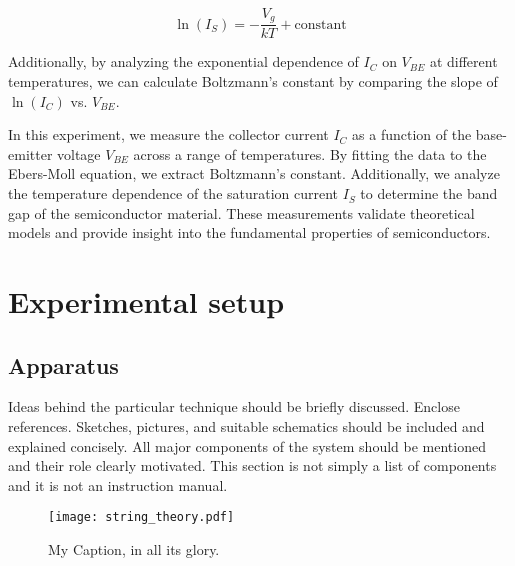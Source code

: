 \documentclass[12pt,letterpaper,onecolumn]{article}
\begin{document}
\[
\ln(I_S) = -\frac{V_g}{kT} + \text{constant}
\]

Additionally, by analyzing the exponential dependence of \( I_C \) on \( V_{BE} \) at different temperatures, we can calculate Boltzmann’s constant by comparing the slope of \( \ln(I_C) \) vs. \( V_{BE} \).

In this experiment, we measure the collector current \( I_C \) as a function of the base-emitter voltage \( V_{BE} \) across a range of temperatures. By fitting the data to the Ebers-Moll equation, we extract Boltzmann’s constant. Additionally, we analyze the temperature dependence of the saturation current \( I_S \) to determine the band gap of the semiconductor material. These measurements validate theoretical models and provide insight into the fundamental properties of semiconductors.



\section{Experimental setup}


\subsection{Apparatus}

Ideas behind the particular technique should be briefly
discussed. Enclose references. Sketches, pictures, and
suitable schematics should be included and explained
concisely. All major components of the system should be
mentioned and their role clearly motivated. This section
is not simply a list of components and it is not an
instruction manual. 



\begin{figure}[h]
 \begin{center}
 \texttt{[image: string\_theory.pdf]}
 \caption{ My Caption, in all its glory.\label{fig:apparatus} }
 \end{center}
\end{figure}
\end{document}
